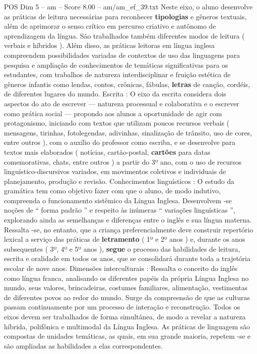 \begin{textsample}{POS Dim 5 – am – Score 8.00 – am/am\_ef\_39.txt}
Neste eixo, o aluno desenvolve as práticas de leitura necessárias para reconhecer \textbf{tipologias} e gêneros textuais, além de aprimorar o senso crítico em percurso criativo e autônomo de aprendizagem da língua.
São trabalhados também diferentes modos de leitura ( verbais e híbridos ).
Além disso, as práticas leitoras em língua inglesa compreendem possibilidades variadas de contextos de uso das linguagens para pesquisa e ampliação de conhecimentos de temáticas significativas para os estudantes, com trabalhos de natureza interdisciplinar e fruição estética de gêneros infantis como lendas, contos, crônicas, fábulas, \textbf{letras} de canção, cordéis, de diferentes lugares do mundo.
Escrita : O eixo da escrita considera dois aspectos do ato de escrever — natureza processual e colaborativa e o escrever como prática social — propondo aos alunos a oportunidade de agir com protagonismo, iniciando com textos que utilizam poucos recursos verbais ( mensagens, tirinhas, fotolegendas, adivinhas, sinalização de trânsito, uso de cores, entre outros ), com o auxílio do professor como escriba, e se desenvolve para textos mais elaborados ( notícias, cartão-postal, \textbf{cartões} para datas comemorativas, chats, entre outros ) a partir do 3º ano, com o uso de recursos linguístico-discursivos variados, em movimentos coletivos e individuais de planejamento, produção e revisão.
Conhecimentos linguísticos : O estudo da gramática tem como objetivo fazer com que o aluno, de modo indutivo, compreenda o funcionamento sistêmico da Língua Inglesa.
Desenvolvem -se noções de “ forma padrão ” e respeito às inúmeras “ variações linguísticas ”, explorando ainda as semelhanças e diferenças entre o inglês e sua língua materna.
Ressalta -se, no entanto, que a criança preferencialmente deve construir repertório lexical a serviço das práticas de \textbf{letramento} ( 1º e 2º anos ) e, durante os anos subsequentes ( 3º, 4º e 5º anos ), \textbf{segue} o processo das habilidades de leitura, escrita e oralidade em todos os anos, que se consolidará durante toda a trajetória escolar de nove anos.
Dimensões interculturais : Ressalta o conceito do inglês como língua franca, analisando os diferentes papéis da própria Língua Inglesa no mundo, seus valores, brincadeiras, costumes familiares, alimentação, vestimentas de diferentes povos ao redor do mundo.
Surge da compreensão de que as culturas passam continuamente por um processo de interação e reconstrução.
Todos os eixos devem ser trabalhados de forma simultânea, de modo a revelar a natureza híbrida, polifônica e multimodal da Língua Inglesa.
As práticas de linguagem são compostas de unidades temáticas, as quais, em sua grande maioria, repetem -se e são ampliadas as habilidades a elas correspondentes.

\end{textsample}
